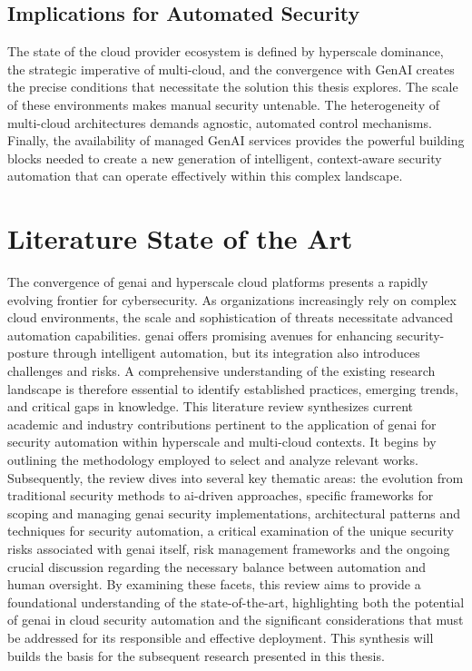 \subsection{Implications for Automated Security}
The state of the cloud provider ecosystem is defined by \gls{hyperscale} dominance, the strategic imperative of \gls{multi-cloud}, and the convergence with GenAI creates the precise conditions that necessitate the solution this thesis explores. The scale of these environments makes manual security untenable. The heterogeneity of \gls{multi-cloud} architectures demands agnostic, automated control mechanisms. Finally, the availability of managed GenAI services provides the powerful building blocks needed to create a new generation of intelligent, context-aware security automation that can operate effectively within this complex landscape.

\section{Literature State of the Art} %
\label{sec:State-of-the-Art}

The convergence of \gls{genai} and \gls{hyperscale} cloud platforms presents a rapidly evolving frontier for cybersecurity. As organizations increasingly rely on complex cloud environments, the scale and sophistication of threats necessitate advanced automation capabilities. \gls{genai} offers promising avenues for enhancing \gls{security-posture} through intelligent automation, but its integration also introduces challenges and risks. A comprehensive understanding of the existing research landscape is therefore essential to identify established practices, emerging trends, and critical gaps in knowledge.
This literature review synthesizes current academic and industry contributions pertinent to the application of \gls{genai} for security automation within \gls{hyperscale} and \gls{multi-cloud} contexts. It begins by outlining the methodology employed to select and analyze relevant works. Subsequently, the review dives into several key thematic areas: the evolution from traditional security methods to \gls{ai}-driven approaches, specific frameworks for scoping and managing \gls{genai} security implementations, architectural patterns and techniques for security automation, a critical examination of the unique security risks associated with \gls{genai} itself, risk management frameworks and the ongoing crucial discussion regarding the necessary balance between automation and human oversight. By examining these facets, this review aims to provide a foundational understanding of the state-of-the-art, highlighting both the potential of \gls{genai} in cloud security automation and the significant considerations that must be addressed for its responsible and effective deployment. This synthesis will builds the basis for the subsequent research presented in this thesis.

